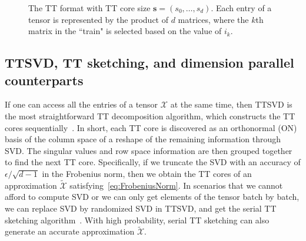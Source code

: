 \documentclass[11pt,a4paper,review]{siamart220329}
\begin{document}
\begin{figure}
\centering
{}
\caption{The TT format with TT core size $\pmb{s} = (s_0,\ldots,s_d)$. Each entry of a tensor is represented by the product of $d$ matrices, where the $k$th matrix in the ``train" is selected based on the value of $i_k$.}
\label{fig:TT}
\end{figure}

\subsection{TTSVD, TT sketching, and dimension parallel counterparts}
\label{sec:TTSVDalg}
If one can access all the entries of a tensor $\mathcal{X}$ at the same time, then TTSVD is the most straightforward TT decomposition algorithm, which constructs the TT cores sequentially~\cite{oseledets2011tensor}. In short, each TT core is discovered as an orthonormal (ON) basis of the column space of a reshape of the remaining information through SVD. The singular values and row space information are then grouped together to find the next TT core. Specifically, if we truncate the SVD with an accuracy of $\epsilon/\sqrt{d-1}$ in the Frobenius norm, then we obtain the TT cores of an approximation $\tilde{\mathcal{X}}$ satisfying~\cref{eq:FrobeniusNorm}. In scenarios that we cannot afford to compute SVD or we can only get elements of the tensor batch by batch, we can replace SVD by randomized SVD in TTSVD, and get the serial TT sketching algorithm~\cite{che2019randomized}. With high probability, serial TT sketching can also generate an accurate approximation $\tilde{\mathcal{X}}$.
\end{document}

